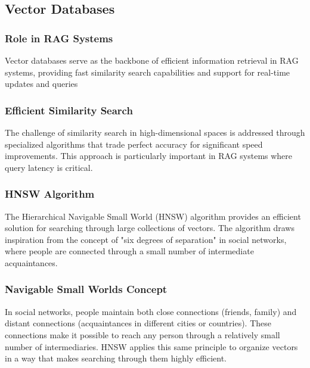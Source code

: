 \documentclass[12pt]{article}
\begin{document}
    \newpage
    \subsection{Vector Databases}
    \subsubsection{Role in RAG Systems}
    Vector databases serve as the backbone of efficient information retrieval in RAG systems, providing 
    fast similarity search capabilities and support for real-time updates and queries

    \subsubsection{Efficient Similarity Search}
    The challenge of similarity search in high-dimensional spaces is addressed through specialized algorithms 
    that trade perfect accuracy for significant speed improvements. This approach is particularly important 
    in RAG systems where query latency is critical.

    \subsubsection{HNSW Algorithm}
    The Hierarchical Navigable Small World (HNSW) algorithm
    \cite{hnsw_paper} provides an efficient solution for searching through large collections of vectors. 
    The algorithm draws inspiration from the concept of "six degrees of separation" in social networks, where 
    people are connected through a small number of intermediate acquaintances.

    \subsubsection*{Navigable Small Worlds Concept}
    In social networks, people maintain both close connections (friends, family) and distant connections 
    (acquaintances in different cities or countries). These connections make it possible to reach any person 
    through a relatively small number of intermediaries. HNSW applies this same principle to organize vectors in a 
    way that makes searching through them highly efficient.

    \pagebreak
\end{document}

